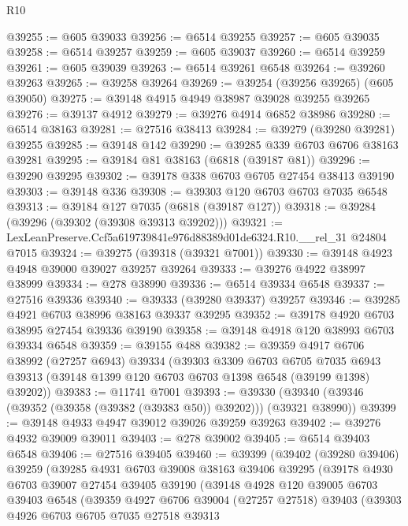 \begin{lexlean}{R10}
\begin{coremodule}
@39255 := @605 @39033
@39256 := @6514 @39255
@39257 := @605 @39035
@39258 := @6514 @39257
@39259 := @605 @39037
@39260 := @6514 @39259
@39261 := @605 @39039
@39263 := @6514 @39261 @6548
@39264 := @39260 @39263
@39265 := @39258 @39264
@39269 := @39254 (@39256 @39265) (@605 @39050)
@39275 := @39148 @4915 @4949 @38987 @39028 @39255 @39265
@39276 := @39137 @4912
@39279 := @39276 @4914 @6852 @38986
@39280 := @6514 @38163
@39281 := @27516 @38413
@39284 := @39279 (@39280 @39281) @39255
@39285 := @39148 @142
@39290 := @39285 @339 @6703 @6706 @38163 @39281
@39295 := @39184 @81 @38163 (@6818 (@39187 @81))
@39296 := @39290 @39295
@39302 := @39178 @338 @6703 @6705 @27454 @38413 @39190
@39303 := @39148 @336
@39308 := @39303 @120 @6703 @6703 @7035 @6548
@39313 := @39184 @127 @7035 (@6818 (@39187 @127))
@39318 := @39284 (@39296 (@39302 (@39308 @39313 @39202)))
@39321 := LexLeanPreserve.Ccf5a619739841e976d88389d01de6324.R10.__rel_31 @24804 @7015
@39324 := @39275 (@39318 (@39321 @7001))
@39330 := @39148 @4923 @4948 @39000 @39027 @39257 @39264
@39333 := @39276 @4922 @38997 @38999
@39334 := @278 @38990
@39336 := @6514 @39334 @6548
@39337 := @27516 @39336
@39340 := @39333 (@39280 @39337) @39257
@39346 := @39285 @4921 @6703 @38996 @38163 @39337 @39295
@39352 := @39178 @4920 @6703 @38995 @27454 @39336 @39190
@39358 := @39148 @4918 @120 @38993 @6703 @39334 @6548
@39359 := @39155 @488
@39382 := @39359
    @4917
    @6706
    @38992
    (@27257 @6943)
    @39334
    (@39303
      @3309
      @6703
      @6705
      @7035
      @6943
      @39313
      (@39148 @1399 @120 @6703 @6703 @1398 @6548 (@39199 @1398) @39202))
@39383 := @11741 @7001
@39393 := @39330 (@39340 (@39346 (@39352 (@39358 (@39382 (@39383 @50)) @39202))) (@39321 @38990))
@39399 := @39148 @4933 @4947 @39012 @39026 @39259 @39263
@39402 := @39276 @4932 @39009 @39011
@39403 := @278 @39002
@39405 := @6514 @39403 @6548
@39406 := @27516 @39405
@39460 := @39399
    (@39402
      (@39280 @39406)
      @39259
      (@39285
        @4931
        @6703
        @39008
        @38163
        @39406
        @39295
        (@39178
          @4930
          @6703
          @39007
          @27454
          @39405
          @39190
          (@39148
            @4928
            @120
            @39005
            @6703
            @39403
            @6548
            (@39359
              @4927
              @6706
              @39004
              (@27257 @27518)
              @39403
              (@39303
                @4926
                @6703
                @6705
                @7035
                @27518
                @39313

\end{coremodule}
\end{lexlean}
